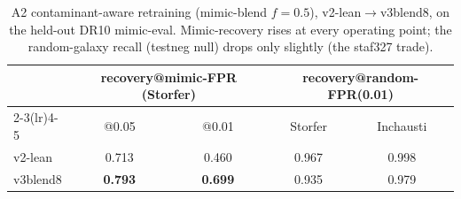 \begin{table}[t]\centering
\caption{A2 contaminant-aware retraining (mimic-blend $f{=}0.5$), v2-lean$\to$v3blend8, on the held-out DR10 mimic-eval. Mimic-recovery rises at every operating point; the random-galaxy recall (testneg null) drops only slightly (the staf327 trade).}
\label{tab:a2}\small
\begin{tabular}{lcccc}
\toprule
 & \multicolumn{2}{c}{recovery@mimic-FPR (Storfer)} & \multicolumn{2}{c}{recovery@random-FPR(0.01)}\\
\cmidrule(lr){2-3}\cmidrule(lr){4-5}
 & @0.05 & @0.01 & Storfer & Inchausti\\
\midrule
v2-lean & 0.713 & 0.460 & 0.967 & 0.998\\
v3blend8 & \textbf{0.793} & \textbf{0.699} & 0.935 & 0.979\\
\bottomrule
\end{tabular}
\end{table}
